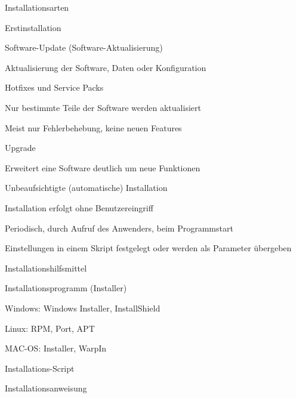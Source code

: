 \documentclass[a4paper]{article}
\begin{document}
\begin{multicols}{3}
  Installationsarten
  \begin{itemize*}
    \item Erstinstallation
    \item Software-Update (Software-Aktualisierung)
    \begin{itemize*}
      \item Aktualisierung der Software, Daten oder Konfiguration
    \end{itemize*}
    \item Hotfixes und Service Packs
    \begin{itemize*}
      \item Nur bestimmte Teile der Software werden aktualisiert
      \item Meist nur Fehlerbehebung, keine neuen Features
    \end{itemize*}
    \item Upgrade
    \begin{itemize*}
      \item Erweitert eine Software deutlich um neue Funktionen
    \end{itemize*}
    \item Unbeaufsichtigte (automatische) Installation
    \begin{itemize*}
      \item Installation erfolgt ohne Benutzereingriff
      \item Periodisch, durch Aufruf des Anwenders, beim Programmstart
      \item Einstellungen in einem Skript festgelegt oder werden als Parameter übergeben
    \end{itemize*}
  \end{itemize*}

  Installationshilfsmittel
  \begin{itemize*}
    \item Installationsprogramm (Installer)
    \begin{itemize*}
      \item Windows: Windows Installer, InstallShield
      \item Linux: RPM, Port, APT
      \item MAC-OS: Installer, WarpIn
    \end{itemize*}
    \item Installations-Script
    \item Installationsanweisung
  \end{itemize*}


\end{multicols}
\end{document}
